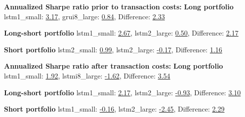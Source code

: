 \textbf{Annualized Sharpe ratio prior to transaction costs:}
\indent\newline
\textbf{Long portfolio} 
\indent\newline
lstm1\_small: \underline{3.17},  grui8\_large: \underline{0.84},  Difference: \underline{2.33}

\indent\newline
\textbf{Long-short portfolio} 
\indent\newline
lstm1\_small: \underline{2.67},  lstm2\_large: \underline{0.50},  Difference:  \underline{2.17}  

\indent\newline
\textbf{Short portfolio} 
\indent\newline
lstm2\_small: \underline{0.99},  lstm2\_large: \underline{-0.17},  Difference: \underline{1.16} 

\begin{table}[ht]
\centering
\caption{\textbf{Best Annualized Sharpe ratio prior to transaction costs - small vs large}}
\end{table}

\indent\newline
\indent\newline
\textbf{Annualized Sharpe ratio after transaction costs:}
\indent\newline
\textbf{Long portfolio} 
\indent\newline
lstm1\_small: \underline{1.92},  lstmi8\_large: \underline{-1.62},  Difference: \underline{3.54}

\indent\newline
\textbf{Long-short portfolio}
\indent\newline
lstm1\_small: \underline{2.17},  lstm2\_large: \underline{-0.93},  Difference: \underline{3.10} 
  
\indent\newline
\textbf{Short portfolio} 
\indent\newline
lstm1\_small: \underline{-0.16},  lstm2\_large: \underline{-2.45},  Difference: \underline{2.29}  
